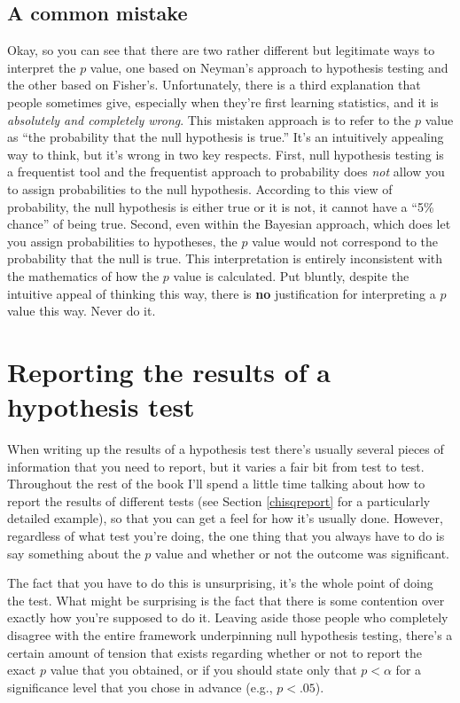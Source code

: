 \documentclass[
]{book}
\begin{document}
\hypertarget{a-common-mistake}{%
\subsection{A common mistake}\label{a-common-mistake}}

Okay, so you can see that there are two rather different but legitimate ways to interpret the \(p\) value, one based on Neyman's approach to hypothesis testing and the other based on Fisher's. Unfortunately, there is a third explanation that people sometimes give, especially when they're first learning statistics, and it is \emph{absolutely and completely wrong}. This mistaken approach is to refer to the \(p\) value as ``the probability that the null hypothesis is true.'' It's an intuitively appealing way to think, but it's wrong in two key respects. First, null hypothesis testing is a frequentist tool and the frequentist approach to probability does \emph{not} allow you to assign probabilities to the null hypothesis. According to this view of probability, the null hypothesis is either true or it is not, it cannot have a ``5\% chance'' of being true. Second, even within the Bayesian approach, which does let you assign probabilities to hypotheses, the \(p\) value would not correspond to the probability that the null is true. This interpretation is entirely inconsistent with the mathematics of how the \(p\) value is calculated. Put bluntly, despite the intuitive appeal of thinking this way, there is \textbf{no} justification for interpreting a \(p\) value this way. Never do it.

\hypertarget{writeup}{%
\section{Reporting the results of a hypothesis test}\label{writeup}}

When writing up the results of a hypothesis test there's usually several pieces of information that you need to report, but it varies a fair bit from test to test. Throughout the rest of the book I'll spend a little time talking about how to report the results of different tests (see Section \ref{chisqreport} for a particularly detailed example), so that you can get a feel for how it's usually done. However, regardless of what test you're doing, the one thing that you always have to do is say something about the \(p\) value and whether or not the outcome was significant.

The fact that you have to do this is unsurprising, it's the whole point of doing the test. What might be surprising is the fact that there is some contention over exactly how you're supposed to do it. Leaving aside those people who completely disagree with the entire framework underpinning null hypothesis testing, there's a certain amount of tension that exists regarding whether or not to report the exact \(p\) value that you obtained, or if you should state only that \(p < \alpha\) for a significance level that you chose in advance (e.g., \(p<.05\)).
\end{document}
